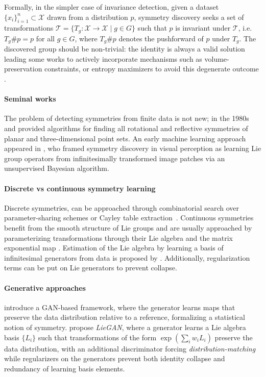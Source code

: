 \documentclass[mathematics,review,submit,moreauthors]{Definitions/mdpi}
\begin{document}
Formally, in the simpler case of invariance detection, given a dataset $\{x_i\}_{i=1}^n \subset \mathcal{X}$ drawn from a distribution $p$, symmetry discovery seeks a set of transformations $\mathcal{T} = \{T_g : \mathcal{X} \to \mathcal{X} \mid g \in G\}$ such that $p$ is invariant under $\mathcal{T}$, i.e.\ $T_g \# p = p$ for all $g \in G$, where $T_g \# p$ denotes the pushforward of $p$ under $T_g$.
The discovered group should be non-trivial: the identity is always a valid solution leading some works to actively incorporate mechanisms such as volume-preservation constraints, or entropy maximizers to avoid this degenerate outcome \citep{benton2020anips,yang2023p4icml,escriche2025}.
 
\paragraph{Seminal works}
The problem of detecting symmetries from finite data is not new; in the 1980s \citet{highnam1985} and \citet{wolter1985tvc} provided algorithms for finding all rotational and reflective symmetries of planar and three-dimensional point sets.
An early machine learning approach appeared in \citet{rao1998anips}, who framed symmetry discovery in visual perception as learning Lie group operators from infinitesimally transformed image patches via an unsupervised Bayesian algorithm.

\paragraph{Discrete vs continuous symmetry learning}
Discrete symmetries, can be approached through combinatorial search over parameter-sharing schemes \citep{yeh2022p2icais,zhou2021} or Cayley table extraction~\citep{sanborn2022}.
Continuous symmetries benefit from the smooth structure of Lie groups and are usually approached by parameterizing transformations through their Lie algebra and the matrix exponential map \citep{benton2020anips,ouderaa2022}.
Estimation of the Lie algebra by learning a basis of infinitesimal generators from data is proposed by  \citet{dehmamy2021anips,yang2023p4icml}.
Additionally, regularization terms can be put on Lie generators \citep{escriche2025} to prevent collapse.

\paragraph{Generative approaches}
\citet{desai2022prd} introduce a GAN-based framework, where the generator learns maps that preserve the data distribution relative to a reference, formalizing a statistical notion of symmetry.
\citet{yang2023p4icml} propose \textit{LieGAN}, where a generator learns a Lie algebra basis $\{L_i\}$ such that transformations of the form $\exp(\sum_i w_i L_i)$ preserve the data distribution, with an additional discriminator forcing \textit{distribution-matching} while regularizers on the generators prevent both identity collapse and redundancy of learning basis elements.
\end{document}
